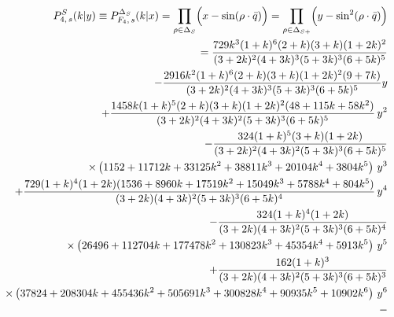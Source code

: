 \documentclass[a4paper,12pt]{article}
\begin{document}
\begin{eqnarray}
   &&\hspace{-5mm}\;\;P_{4,\,s}^S(k|y)\equiv P_{F_4,\,s}^{\Delta_S}(k|x)
   =\prod_{\rho\in{\Delta_{S}}}\Bigl(x-\sin(\rho\cdot\bar{q})\Bigr)
   =\prod_{\rho\in{\Delta_{S+}}}\Bigl(y-\sin^2(\rho\cdot\bar{q})\Bigr)
   \nonumber\\
%
   &&\hspace{-8mm}
   ={729k^3(1 + k)^6(2 + k)(3 + k)(1 + 2k)^2\over
        {(3 + 2k)^2(4 + 3k)^3(5 + 3k)^3(6 + 5k)^5}}\nonumber\\
   &&\hspace{-5mm}\;\; -
     {2916k^2(1 + k)^6(2 + k)(3 + k)(1 + 2k)^2(9 + 7k)\over
        {(3 + 2k)^2(4 + 3k)^3(5 + 3k)^3(6 + 5k)^5} }y\nonumber\\
   &&\hspace{-5mm}\;\; +
       {1458k(1 + k)^5(2 + k)(3 + k)(1 + 2k)^2(48 + 115k + 58k^2)\over
        {(3 + 2k)^2(4 + 3k)^2(5 + 3k)^3(6 + 5k)^5 }}\,y^2\nonumber\\
   &&\hspace{-5mm}\;\; -
       {324(1 + k)^5(3 + k)(1 + 2k)\over{(3 + 2k)^2(4 + 3k)^2
         (5 + 3k)^3(6 + 5k)^5}}\nonumber\\
   &&\hspace{-5mm}\;\;\quad\times
   \left(1152 + 11712k + 33125k^2 +
          38811k^3 + 20104k^4 + 3804k^5\right)\,y^3\nonumber\\
   &&\hspace{-5mm}\;\;
	   + {729(1 + k)^4(1 + 2k)
   (1536 + 8960k + 17519k^2 + 15049k^3 + 5788k^4 + 804k^5) \over
        {(3 + 2k)(4 + 3k)^2(5 + 3k)^3(6 + 5k)^4}}\, y^4\nonumber\\
   &&\hspace{-5mm}\;\;-
       {324(1 + k)^4(1 + 2k)\over{(3 + 2k)(4 + 3k)^2(5 + 3k)^3
         (6 + 5k)^4}}\nonumber\\
   &&\hspace{-5mm}\;\;\quad\times
   \left(26496 + 112704k + 177478k^2 + 130823k^3 +
          45354k^4 + 5913k^5\right)\,y^5\nonumber\\
   &&\hspace{-5mm}\;\;
	   + {162(1 + k)^3\over
       {(3 + 2k)(4 + 3k)^2(5 + 3k)^3(6 + 5k)^3}}\nonumber\\
   &&\hspace{-5mm}\;\;\quad\times
   \left(37824 + 208304k + 455436k^2 +
          505691k^3 + 300828k^4 + 90935k^5 + 10902k^6\right) \,y^6\nonumber\\
   &&\hspace{-5mm}\;\; -

\end{eqnarray}
\end{document}
